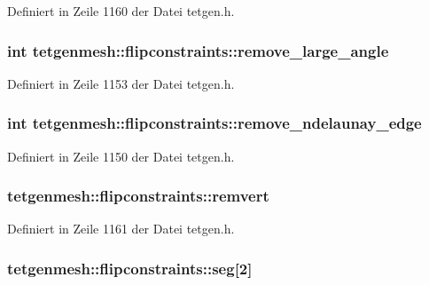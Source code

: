 Definiert in Zeile 1160 der Datei tetgen.\-h.

\hypertarget{classtetgenmesh_1_1flipconstraints_abc7659ab61a966b1a47560fd07a58ccb}{
\subsubsection[{remove\-\_\-large\-\_\-angle}]{\setlength{\rightskip}{0pt plus 5cm}int tetgenmesh\-::flipconstraints\-::remove\-\_\-large\-\_\-angle}}\label{classtetgenmesh_1_1flipconstraints_abc7659ab61a966b1a47560fd07a58ccb}


Definiert in Zeile 1153 der Datei tetgen.\-h.

\hypertarget{classtetgenmesh_1_1flipconstraints_ab0ac97086329360ad119f215bd4fe02b}{
\subsubsection[{remove\-\_\-ndelaunay\-\_\-edge}]{\setlength{\rightskip}{0pt plus 5cm}int tetgenmesh\-::flipconstraints\-::remove\-\_\-ndelaunay\-\_\-edge}}\label{classtetgenmesh_1_1flipconstraints_ab0ac97086329360ad119f215bd4fe02b}


Definiert in Zeile 1150 der Datei tetgen.\-h.

\hypertarget{classtetgenmesh_1_1flipconstraints_a1a6025cc57533d98fef46ffbdcbbc83f}{
\subsubsection[{remvert}]{ tetgenmesh\-::flipconstraints\-::remvert}}\label{classtetgenmesh_1_1flipconstraints_a1a6025cc57533d98fef46ffbdcbbc83f}


Definiert in Zeile 1161 der Datei tetgen.\-h.

\hypertarget{classtetgenmesh_1_1flipconstraints_a65862c9f061693a1961f96f3f471c95e}{
\subsubsection[{seg}]{ tetgenmesh\-::flipconstraints\-::seg\mbox{[}2\mbox{]}}}\label{classtetgenmesh_1_1flipconstraints_a65862c9f061693a1961f96f3f471c95e}


